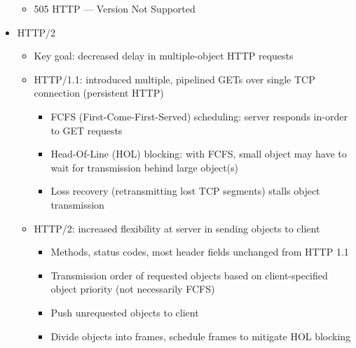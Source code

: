 \begin{itemize}
\begin{itemize}
\begin{itemize}
        \end{itemize}

      \item 505 HTTP — Version Not Supported

    \end{itemize}

  \item HTTP/2

    \begin{itemize}

      \item Key goal: decreased delay in multiple-object HTTP requests

      \item HTTP/1.1: introduced multiple, pipelined GETs over single TCP connection (persistent HTTP)

        \begin{itemize}

          \item FCFS (First-Come-First-Served) scheduling: server responds in-order to GET requests

          \item Head-Of-Line (HOL) blocking: with FCFS, small object may have to wait for transmission behind large object(s)

          \item Loss recovery (retransmitting lost TCP segments) stalls object transmission

        \end{itemize}

      \item HTTP/2: increased flexibility at server in sending objects to client

        \begin{itemize}

          \item Methods, status codes, most header fields unchanged from HTTP 1.1

          \item Transmission order of requested objects based on client-specified object priority (not necessarily FCFS)

          \item Push unrequested objects to client

          \item Divide objects into frames, schedule frames to mitigate HOL blocking

        \end{itemize}


\end{itemize}
\end{itemize}
